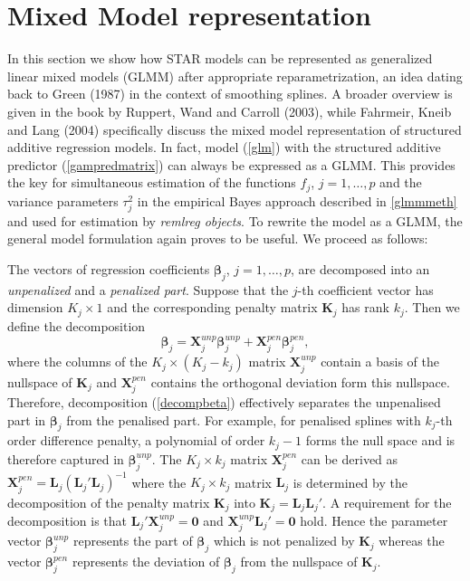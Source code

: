 \documentclass[11pt,a4paper,twoside]{bayesxarticle}
\def \Kvec {\vec{K}}
\def \betavec {\boldsymbol{\beta}}
\def \Kvec {\mathbf{K}}
\def \Lvec {\mathbf{L}}
\def \Xvec {\mathbf{X}}
\def \nullvec {\boldsymbol{0}}
\begin{document}
\section{Mixed Model representation}
\label{glmmrep}

In this section we show how STAR models can be represented as
generalized linear mixed models (GLMM) after appropriate
reparametrization, an idea dating back to Green (1987) in the
context of smoothing splines. A broader overview is given in the
book by Ruppert, Wand and Carroll (2003), while Fahrmeir, Kneib and
Lang (2004) specifically discuss the mixed model representation of
structured additive regression models. In fact, model (\ref{glm})
with the structured additive predictor (\ref{gampredmatrix}) can
always be expressed as a GLMM. This provides the key for
simultaneous estimation of the functions $f_j$, $j=1,\dots,p$ and
the variance parameters $\tau^2_j$ in the empirical Bayes approach
described in \autoref{glmmmeth} and used for estimation by {\em
remlreg objects}. To rewrite the model as a GLMM, the general model
formulation again proves to be useful. We proceed as follows:

The  vectors of regression coefficients $\betavec_j$, $j=1,\dots,p$,
are decomposed into an {\em unpenalized} and a {\em penalized part}.
Suppose that the $j$-th coefficient vector has dimension $K_j \times
1$ and the corresponding penalty matrix $\Kvec_j$ has rank $k_j$. Then
we define the decomposition
\begin{equation}\label{decompbeta}
 \betavec_j = \Xvec_j^{unp} \betavec_j^{unp} + \Xvec_j^{pen}\betavec_j^{pen},
\end{equation}
where the columns of the $K_j \times (K_j - k_j)$ matrix
$\Xvec_j^{unp}$ contain a basis of the nullspace of $\Kvec_j$ and
$\Xvec_j^{pen}$ contains the orthogonal deviation form this
nullspace. Therefore, decomposition (\ref{decompbeta}) effectively
separates the unpenalised part in $\betavec_j$ from the penalised
part. For example, for penalised splines with $k_j$-th order
difference penalty, a polynomial of order $k_j-1$ forms the null
space and is therefore captured in $\betavec_j^{unp}$. The  $K_j
\times k_j$ matrix $\Xvec_j^{pen}$ can be derived as $\Xvec_j^{pen}
= \Lvec_j(\Lvec_j'\Lvec_j)^{-1}$ where the $K_j \times k_j$ matrix
$\Lvec_j$ is determined by the decomposition of the penalty matrix
$\Kvec_j$ into $\Kvec_j = \Lvec_j \Lvec_j'$. A requirement for the
decomposition is that $\Lvec_j' \Xvec_j^{unp} = \nullvec$ and
$\Xvec_j^{unp} \Lvec_j' = \nullvec$ hold. Hence the parameter vector
$\betavec_j^{unp}$ represents the part of $\betavec_j$ which is not
penalized by $\Kvec_j$ whereas the vector $\betavec_j^{pen}$
represents the deviation of $\betavec_j$ from the nullspace of
$\Kvec_j$.
\end{document}
